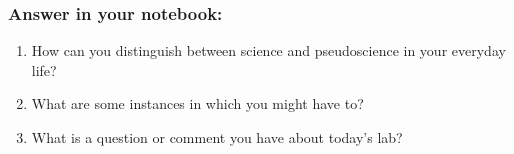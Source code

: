 \documentclass[11pt]{article}
\begin{document}
\subsubsection*{Answer in your notebook:}
\begin{enumerate}
    \item How can you distinguish between science and pseudoscience in your everyday life?
    \item What are some instances in which you might have to?
   
    \item What is a question or comment you have about today's lab?
\end{enumerate}
\end{document}
